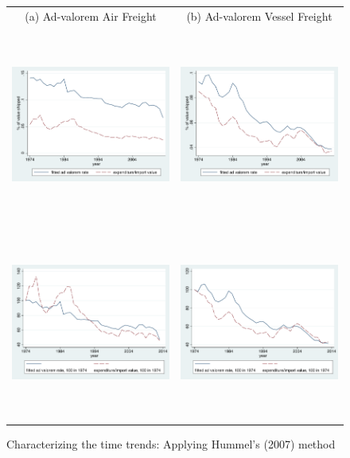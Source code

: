 \documentclass[a4paper,11pt]{article}
\begin{document}
\begin{figure}[htbp]
\caption{Characterizing the time trends: Applying Hummel's (2007) method }
\label{fig:comp_effects_as_in_Hummels}
\begin{center}
\begin{tabular}{cc}
{\small (a) Ad-valorem Air Freight} & {\small (b) Ad-valorem Vessel Freight}\\
\includegraphics[width=3in, height=2.5in]{figure5_comme_hummels.pdf}
& \includegraphics[width=3in,height=2.5in]{figure6_comme_hummels.pdf} \\
\includegraphics[width=3in, height=2.5in]{figure5_comme_hummels_base100.pdf}
& \includegraphics[width=3in,height=2.5in]{figure6_comme_hummels_base100.pdf} \\


\end{tabular}
\end{center}
\end{figure}
\end{document}
